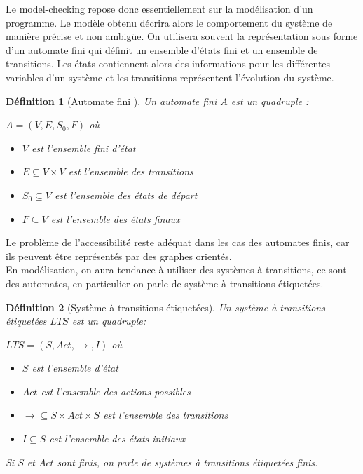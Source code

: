 \documentclass[12pt,a4paper,oneside]{book}
\theoremstyle{break}
\newtheorem{defin}{Définition}[chapter]
\theoremstyle{breakplain}
\begin{document}
Le model-checking repose donc essentiellement sur la modélisation d'un programme. Le modèle obtenu décrira alors le comportement du système de manière précise et non ambigüe. On utilisera souvent la représentation sous forme d'un automate fini qui définit un ensemble d'états fini et un ensemble de transitions. Les états contiennent alors des informations pour les différentes variables d'un système et les transitions représentent l'évolution du système.
\begin{defin}[Automate fini \cite{geeraerts2013multiprocessor}]
Un automate fini $A$ est un quadruple :
\begin{center}
$A=(V,E,S_0,F)$ où
\end{center}
\begin{itemize}
\item $V$ est l'ensemble fini d'état
\item $E \subseteq V \times V$ est l'ensemble des transitions
\item $S_0 \subseteq V$ est l'ensemble des états de départ
\item $F \subseteq V$ est l'ensemble des états finaux
\end{itemize}
\end{defin}

Le problème de l'accessibilité reste adéquat dans les cas des automates finis, car ils peuvent être représentés par des graphes orientés.\\

En modélisation, on aura tendance à utiliser des systèmes à transitions, ce sont des automates, en particulier on parle de système à transitions étiquetées.

\begin{defin}[Système à transitions étiquetées]
Un système à transitions étiquetées $LTS$ est un quadruple:
\begin{center}
$LTS = (S, Act, \rightarrow, I)$ où
\end{center}
\begin{itemize}
\item $S$ est l'ensemble d'état
\item $Act$ est l'ensemble des actions possibles
\item $\rightarrow \subseteq S \times Act \times S$ est l'ensemble des transitions
\item $I \subseteq S$ est l'ensemble des états initiaux
\end{itemize}
Si $S$ et $Act$ sont finis, on parle de systèmes à transitions étiquetées finis.
\end{defin}
\end{document}

